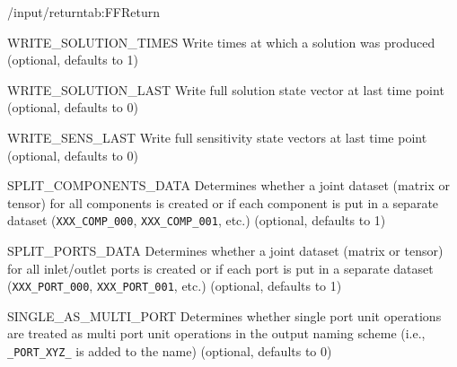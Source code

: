\begin{groupscope}{/input/return}{tab:FFReturn}
  \begin{dataset}[type = int, range={$\{0,1\}$}]{WRITE\_SOLUTION\_TIMES}
    Write times at which a solution was produced (optional, defaults to 1)
  \end{dataset}
  \begin{dataset}[type = int, range={$\{0,1\}$}]{WRITE\_SOLUTION\_LAST}
    Write full solution state vector at last time point (optional, defaults to 0)
  \end{dataset}
  \begin{dataset}[type = int, range={$\{0,1\}$}]{WRITE\_SENS\_LAST}
    Write full sensitivity state vectors at last time point (optional, defaults to 0)
  \end{dataset}
  \begin{dataset}[type = int, range={$\{0,1\}$}]{SPLIT\_COMPONENTS\_DATA}
    Determines whether a joint dataset (matrix or tensor) for all components is created or if each component is put in a separate dataset (\texttt{XXX\_COMP\_000}, \texttt{XXX\_COMP\_001}, etc.) (optional, defaults to 1)
  \end{dataset}
  \begin{dataset}[type = int, range={$\{0,1\}$}]{SPLIT\_PORTS\_DATA}
    Determines whether a joint dataset (matrix or tensor) for all inlet/outlet ports is created or if each port is put in a separate dataset (\texttt{XXX\_PORT\_000}, \texttt{XXX\_PORT\_001}, etc.) (optional, defaults to 1)
  \end{dataset}
  \begin{dataset}[type = int, range={$\{0,1\}$}]{SINGLE\_AS\_MULTI\_PORT}
    Determines whether single port unit operations are treated as multi port unit operations in the output naming scheme (i.e., \texttt{\_PORT\_XYZ\_} is added to the name) (optional, defaults to 0)
  \end{dataset}
\end{groupscope}

